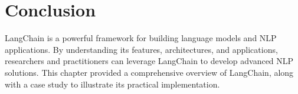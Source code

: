 \section{Conclusion}
LangChain is a powerful framework for building language models and NLP applications. By understanding its features, architectures, and applications, researchers and practitioners can leverage LangChain to develop advanced NLP solutions. This chapter provided a comprehensive overview of LangChain, along with a case study to illustrate its practical implementation.


% 
% 